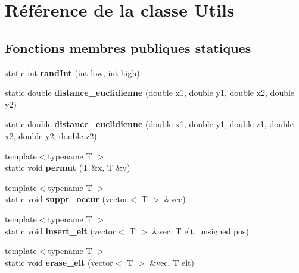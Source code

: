 \hypertarget{classUtils}{}\section{Référence de la classe Utils}
\label{classUtils}
\subsection*{Fonctions membres publiques statiques}
\begin{DoxyCompactItemize}
\item 
\mbox{\label{classUtils_ab00536f38dfbf20a6ece24a72ff74387}} 
static int {\bfseries rand\+Int} (int low, int high)
\item 
\mbox{\label{classUtils_a6c28f18b5b4c673d67429e753f0e600b}} 
static double {\bfseries distance\+\_\+euclidienne} (double x1, double y1, double x2, double y2)
\item 
\mbox{\label{classUtils_a33c31f7487518f79f761935dca17b086}} 
static double {\bfseries distance\+\_\+euclidienne} (double x1, double y1, double z1, double x2, double y2, double z2)
\item 
\mbox{\label{classUtils_ace838c5683e67bad4328b63d7977e601}} 
{\footnotesize template$<$typename T $>$ }\\static void {\bfseries permut} (T \&x, T \&y)
\item 
\mbox{\label{classUtils_a59a8a20472eac6c9a5e9186822745dce}} 
{\footnotesize template$<$typename T $>$ }\\static void {\bfseries suppr\+\_\+occur} (vector$<$ T $>$ \&vec)
\item 
\mbox{\label{classUtils_ad08ccfbdfda6b8b38052f85585d9b45c}} 
{\footnotesize template$<$typename T $>$ }\\static void {\bfseries insert\+\_\+elt} (vector$<$ T $>$ \&vec, T elt, unsigned pos)
\item 
\mbox{\label{classUtils_a957d093b681edccc872c10a0f6b27489}} 
{\footnotesize template$<$typename T $>$ }\\static void {\bfseries erase\+\_\+elt} (vector$<$ T $>$ \&vec, T elt)
\item 

\end{DoxyCompactItemize}
